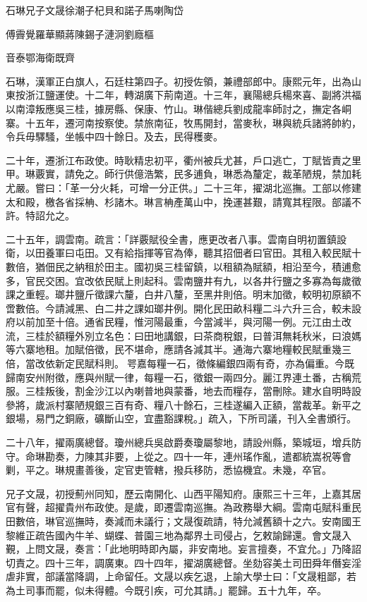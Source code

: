 
\begin{pinyinscope}
石琳兄子文晟徐潮子杞貝和諾子馬喇陶岱

傅霽覺羅華顯蔣陳錫子漣泂劉廕樞

音泰鄂海衛既齊

石琳，漢軍正白旗人，石廷柱第四子。初授佐領，兼禮部郎中。康熙元年，出為山東按浙江鹽運使。十二年，轉湖廣下荊南道。十三年，襄陽總兵楊來喜、副將洪福以南漳叛應吳三桂，據房縣、保康、竹山。琳偕總兵劉成龍率師討之，撫定各峒寨。十五年，遷河南按察使。禁旅南征，牧馬開封，當麥秋，琳與統兵諸將帥約，令兵毋驛騷，坐帳中四十餘日。及去，民得穫麥。

二十年，遷浙江布政使。時耿精忠初平，衢州被兵尤甚，戶口逃亡，丁賦皆責之里甲。琳覈實，請免之。師行供億浩繁，民多逋負，琳悉為釐定，裁革陋規，禁加耗尤嚴。嘗曰：「革一分火耗，可增一分正供。」二十三年，擢湖北巡撫。工部以修建太和殿，檄各省採柟、杉諸木。琳言柟產萬山中，挽運甚艱，請寬其程限。部議不許。特詔允之。

二十五年，調雲南。疏言：「詳覈賦役全書，應更改者八事。雲南自明初置鎮設衛，以田養軍曰屯田。又有給指揮等官為俸，聽其招佃者曰官田。其租入較民賦十數倍，猶佃民之納租於田主。國初吳三桂留鎮，以租額為賦額，相沿至今，積逋愈多，官民交困。宜改依民賦上則起科。雲南鹽井有九，以各井行鹽之多寡為每歲徵課之重輕。瑯井鹽斤徵課六釐，白井八釐，至黑井則倍。明末加徵，較明初原額不啻數倍。今請減黑、白二井之課如瑯井例。開化民田畝科糧二斗六升三合，較未設府以前加至十倍。通省民糧，惟河陽最重，今當減半，與河陽一例。元江由土改流，三桂於額糧外別立名色：曰田地講銀，曰茶商稅銀，曰普洱無耗秋米，曰浪媽等六寨地租。加賦倍徵，民不堪命，應請各減其半。通海六寨地糧較民賦重幾三倍，當改依新定民賦科則。咢嘉每糧一石，徵條編銀四兩有奇，亦為偏重。今既歸南安州附徵，應與州賦一律，每糧一石，徵銀一兩四分。麗江界連土番，古稱荒服。三桂叛後，割金沙江以內喇普地與蒙番，地去而糧存，當刪除。建水自明時設參將，歲派村寨陋規銀三百有奇、糧八十餘石，三桂遂編入正額，當裁革。新平之銀場，易門之銅廠，礦斷山空，宜盡豁課稅。」疏入，下所司議，刊入全書頒行。

二十八年，擢兩廣總督。瓊州總兵吳啟爵奏瓊屬黎地，請設州縣，築城垣，增兵防守。命琳勘奏，力陳其非要，上從之。四十一年，連州瑤作亂，遣都統嵩祝等會剿，平之。琳規畫善後，定官吏管轄，撥兵移防，悉協機宜。未幾，卒官。

兄子文晟，初授薊州同知，歷云南開化、山西平陽知府。康熙三十三年，上嘉其居官有聲，超擢貴州布政使。是歲，即遷雲南巡撫。為政務舉大綱。雲南屯賦科重民田數倍，琳官巡撫時，奏減而未議行；文晟復疏請，特允減舊額十之六。安南國王黎維正疏告國內牛羊、蝴蝶、普園三地為鄰界土司侵占，乞敕諭歸還。會文晟入覲，上問文晟，奏言：「此地明時即內屬，非安南地。妄言擅奏，不宜允。」乃降詔切責之。四十三年，調廣東。四十四年，擢湖廣總督。坐劾容美土司田舜年僭妄淫虐非實，部議當降調，上命留任。文晟以疾乞退，上諭大學士曰：「文晟粗鄙，若為土司事而罷，似未得體。今既引疾，可允其請。」罷歸。五十九年，卒。


\end{pinyinscope}
